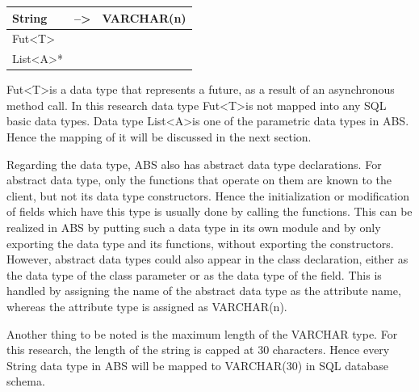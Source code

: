 \documentclass[conference]{IEEEtran}
\begin{document}
\begin{table}[]
\begin{tabular}{|l|l|l|}
		String                                                                                                                                       & --\textgreater                                                           & VARCHAR(n)                                                                                                                            \\ \hline
		Fut\textless T\textgreater*                                                                                                                   &                                                                          &                                                                                                                                       \\ \hline
		List\textless A\textgreater**                                                                                                                 &                                                                          &                                                                                                                                       \\ \hline
	\end{tabular}
\end{table}

Fut\textless T\textgreater is a data type that represents a future, as a result of an asynchronous method call. In this research data type Fut\textless T\textgreater is not mapped into any SQL basic data types. Data type List\textless A\textgreater is one of the parametric data types in ABS. Hence the mapping of it will be discussed in the next section.

Regarding the data type, ABS also has abstract data type declarations. For abstract data type, only the functions that operate on them are known to the client, but not its data type constructors. Hence the initialization or modification of fields which have this type is usually done by calling the functions. This can be realized in ABS by putting such a data type in its own module and by only exporting the data type and its functions, without exporting the constructors. However, abstract data types could also appear in the class declaration, either as the data type of the class parameter or as the data type of the field. This is handled by assigning the name of the abstract data type as the attribute name, whereas the attribute type is assigned as VARCHAR(n).

Another thing to be noted is the maximum length of the VARCHAR type. For this research, the length of the string is capped at 30 characters. Hence every String data type in ABS will be mapped to VARCHAR(30) in SQL database schema.
\end{document}
